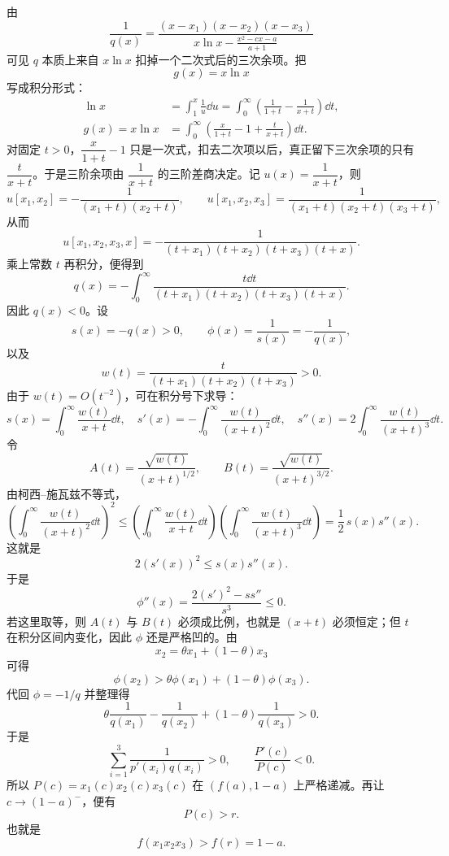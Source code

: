 \begin{solution}
由
\[
\frac{1}{q(x)}=\frac{(x-x_1)(x-x_2)(x-x_3)}{x\ln x-\frac{x^2-cx-a}{a+1}}
\]
可见 $q$ 本质上来自 $x\ln x$ 扣掉一个二次式后的三次余项。把
\[
g(x)=x\ln x
\]
写成积分形式：
\begin{align*}
\ln x
&=\int_1^x\frac1u\dd u
=\int_0^\infty\left(\frac{1}{1+t}-\frac{1}{x+t}\right)\dd t,\\
g(x)=x\ln x
&=\int_0^\infty\left(\frac{x}{1+t}-1+\frac{t}{x+t}\right)\dd t.
\end{align*}
对固定 $t>0$，$\dfrac{x}{1+t}-1$ 只是一次式，扣去二次项以后，真正留下三次余项的只有 $\dfrac{t}{x+t}$。于是三阶余项由 $\dfrac{1}{x+t}$ 的三阶差商决定。记 $u(x)=\dfrac{1}{x+t}$，则
\[
u[x_1,x_2]=-\frac{1}{(x_1+t)(x_2+t)},\qquad
u[x_1,x_2,x_3]=\frac{1}{(x_1+t)(x_2+t)(x_3+t)},
\]
从而
\[
u[x_1,x_2,x_3,x]=-\frac{1}{(t+x_1)(t+x_2)(t+x_3)(t+x)}.
\]
乘上常数 $t$ 再积分，便得到
\[
q(x)= -\int_{0}^{\infty}\frac{t\dd t}{(t+x_1)(t+x_2)(t+x_3)(t+x)}.
\]
因此 $q(x)<0$。设
\[
s(x)=-q(x)>0,\qquad \phi(x)=\frac{1}{s(x)}=-\frac{1}{q(x)},
\]
以及
\[
w(t)=\frac{t}{(t+x_1)(t+x_2)(t+x_3)}>0.
\]
由于 $w(t)=O(t^{-2})$，可在积分号下求导：
\[
s(x)=\int_0^\infty \frac{w(t)}{x+t}\dd t,\quad
s'(x)=-\int_0^\infty \frac{w(t)}{(x+t)^2}\dd t,\quad
s''(x)=2\int_0^\infty \frac{w(t)}{(x+t)^3}\dd t.
\]
令
\[
A(t)=\frac{\sqrt{w(t)}}{(x+t)^{1/2}},\qquad
B(t)=\frac{\sqrt{w(t)}}{(x+t)^{3/2}}.
\]
由柯西--施瓦兹不等式，
\[
\left(\int_0^\infty\frac{w(t)}{(x+t)^2}\dd t\right)^2
\le
\left(\int_0^\infty\frac{w(t)}{x+t}\dd t\right)
\left(\int_0^\infty\frac{w(t)}{(x+t)^3}\dd t\right)
=\frac12\,s(x)s''(x).
\]
这就是
\[
2(s'(x))^2\le s(x)s''(x).
\]
于是
\[
\phi''(x)=\frac{2(s')^2-ss''}{s^3}\le 0.
\]
若这里取等，则 $A(t)$ 与 $B(t)$ 必须成比例，也就是 $(x+t)$ 必须恒定；但 $t$ 在积分区间内变化，因此 \(\phi\) 还是严格凹的。由
\[
x_2=\theta x_1+(1-\theta)x_3
\]
可得
\[
\phi(x_2)>\theta\phi(x_1)+(1-\theta)\phi(x_3).
\]
代回 $\phi=-1/q$ 并整理得
\[
\theta\frac1{q(x_1)}-\frac1{q(x_2)}+(1-\theta)\frac1{q(x_3)}>0.
\]
于是
\[
\sum_{i=1}^3\frac{1}{p'(x_i)q(x_i)}>0,
\qquad
\frac{P'(c)}{P(c)}<0.
\]
所以 $P(c)=x_1(c)x_2(c)x_3(c)$ 在 $(f(a),1-a)$ 上严格递减。再让 $c\to(1-a)^-$，便有
\[
P(c)>r.
\]
也就是
\[
f(x_1x_2x_3)>f(r)=1-a.
\]
\end{solution}




